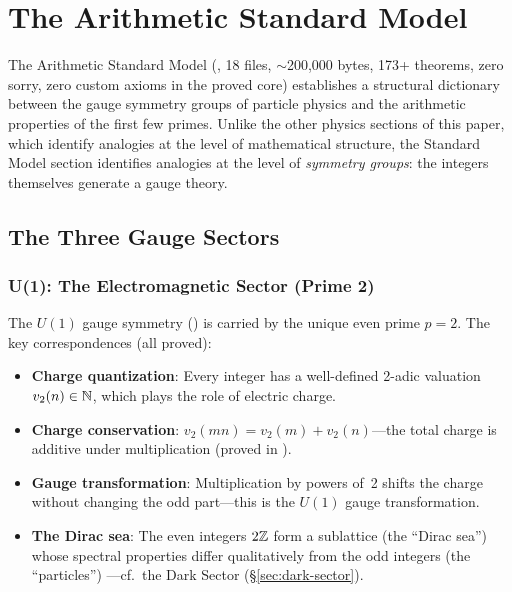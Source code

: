 \section{The Arithmetic Standard Model}
\label{sec:standard-model}

The Arithmetic Standard Model (,
18 files, $\sim$200{,}000 bytes, 173+ theorems, zero sorry, zero custom
axioms in the proved core) establishes a structural dictionary between
the gauge symmetry groups of particle physics and the arithmetic
properties of the first few primes. Unlike the other physics sections
of this paper, which identify analogies at the level of mathematical
structure, the Standard Model section identifies analogies at the level
of \emph{symmetry groups}: the integers themselves generate a gauge theory.

\subsection{The Three Gauge Sectors}

\subsubsection{U(1): The Electromagnetic Sector (Prime 2)}

The $U(1)$ gauge symmetry () is carried by
the unique even prime $p = 2$. The key correspondences (all proved):
\begin{itemize}
  \item \textbf{Charge quantization}: Every integer has a well-defined
    2-adic valuation $v_2(n) \in \mathbb{N}$, which plays the role of
    electric charge.
  \item \textbf{Charge conservation}: $v_2(mn) = v_2(m) + v_2(n)$---the
    total charge is additive under multiplication (proved in
    ).
  \item \textbf{Gauge transformation}: Multiplication by powers of~2
    shifts the charge without changing the odd part---this is the
    $U(1)$ gauge transformation.
  \item \textbf{The Dirac sea}: The even integers $2\mathbb{Z}$ form a
    sublattice (the ``Dirac sea'') whose spectral properties differ
    qualitatively from the odd integers (the ``particles'')
    ---cf.~the Dark Sector (\S\ref{sec:dark-sector}).
\end{itemize}

